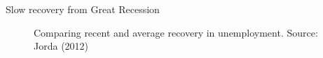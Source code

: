 \begin{frame}{Slow recovery from Great Recession}

\begin{figure}
\begin{center}


\caption{Comparing recent and average recovery in unemployment. Source: Jorda (2012)}

\end{center}
\end{figure}

\end{frame}



